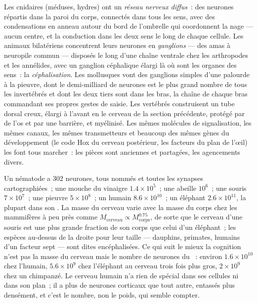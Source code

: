 \begin{definition}\label{def:b3:nervous-systems:comparative}
Les cnidaires (méduses, hydres) ont un \emph{réseau nerveux diffus}~:
des neurones répartis dans la paroi du corps, connectés dans tous les
sens, avec des condensations en anneau autour du bord de l'ombrelle qui
coordonnent la nage --- aucun centre, et la conduction dans les deux
sens le long de chaque cellule. Les animaux bilatériens concentrent
leurs neurones en \emph{ganglions} --- des amas à neuropile commun ---
disposés le long d'une chaîne ventrale chez les arthropodes et les
annélides, avec un ganglion céphalique élargi là où sont les organes des
sens~: la \emph{céphalisation}. Les mollusques vont des ganglions
simples d'une palourde à la pieuvre, dont le demi-milliard de neurones
est le plus grand nombre de tous les invertébrés et dont les deux tiers
sont dans les bras, la chaîne de chaque bras commandant ses propres
gestes de saisie. Les vertébrés construisent un tube dorsal creux,
élargi à l'avant en le cerveau de la section précédente, protégé par de
l'os et par une barrière, et myélinisé. Les mêmes molécules de
signalisation, les mêmes canaux, les mêmes transmetteurs et beaucoup des
mêmes gènes du développement (le code Hox du cerveau postérieur, les
facteurs du plan de l'œil) les font tous marcher~: les pièces sont
anciennes et partagées, les agencements divers.
\end{definition}

\begin{example}\label{ex:b3:nervous-systems:counts}
Un nématode a $302$ neurones, tous nommés et toutes les synapses
cartographiées~; une mouche du vinaigre $1.4\times 10^{5}$~; une abeille
$10^{6}$~; une souris $7\times 10^{7}$~; une pieuvre $5\times 10^{8}$~;
un humain $8.6\times
10^{10}$~; un éléphant $2.6\times 10^{11}$, la plupart dans son
. La masse du cerveau varie avec la masse du corps chez les
mammifères à peu près comme
$M_{\text{cerveau}} \propto M_{\text{corps}}^{0.75}$, de sorte que le
cerveau d'une souris est une plus grande fraction de son corps que celui
d'un éléphant~; les espèces au-dessus de la droite pour leur taille ---
dauphins, primates, humains d'un facteur sept --- sont dites
encéphalisées. Ce qui suit le mieux la cognition n'est pas la masse du
cerveau mais le nombre de neurones du ~: environ
$1.6\times 10^{10}$ chez l'humain, $5.6\times 10^{9}$ chez l'éléphant au
cerveau trois fois plus gros, $2\times 10^{9}$ chez un chimpanzé. Le
cerveau humain n'a rien de spécial dans ses cellules ni dans son plan~;
il a plus de neurones corticaux que tout autre, entassés plus densément,
et c'est le nombre, non le poids, qui semble compter.
\end{example}

